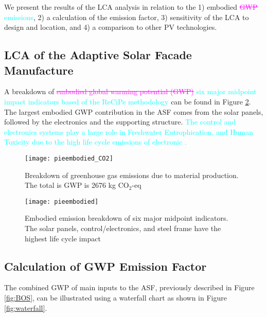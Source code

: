 
We present the results of the LCA analysis in relation to the 1) embodied \textcolor{magenta}{\sout{GWP}} \textcolor{cyan}{emissions}, 2) a calculation of the emission factor, 3) sensitivity of the LCA to design and location, and 4) a comparison to other PV technologies.

\subsection{LCA of the Adaptive Solar Facade Manufacture}

A breakdown of \textcolor{magenta}{\sout{embodied global warming potential (GWP)}} \textcolor{cyan}{six major midpoint impact indicators based of the ReCiPe methodology } can be found in Figure  \ref{fig:embodied}. The largest embodied GWP contribution in the ASF comes from the solar panels, followed by the electronics and the supporting structure. \textcolor{cyan}{The control and electronics systems play a large role in Freshwater Eutrophication, and Human Toxicity due to the high life cycle emissions of electronic .}

\begin{figure}[H]
\begin{center}
\begin{mdframed}[linecolor=magenta, linewidth=2pt]
\texttt{[image: pieembodied\_CO2]}
\caption{Breakdown of greenhouse gas emissions due to material production. The total is GWP is 2676 kg CO$_{2}$-eq}
\label{fig:embodiedold}
\end{mdframed}
\end{center}
\end{figure}

\begin{figure}[H]
\begin{center}
\begin{mdframed}[linecolor=cyan, linewidth=2pt]
\texttt{[image: pieembodied]}
\caption{Embodied emission breakdown of six major midpoint indicators. The solar panels, control/electronics, and steel frame have the highest life cycle impact}
\label{fig:embodied}
\end{mdframed}
\end{center}
\end{figure}

\subsection{Calculation of GWP Emission Factor}
The combined GWP of main inputs to the ASF, previously described in Figure \ref{fig:BOS}, can be illustrated using a waterfall chart as shown in Figure \ref{fig:waterfall}. 


